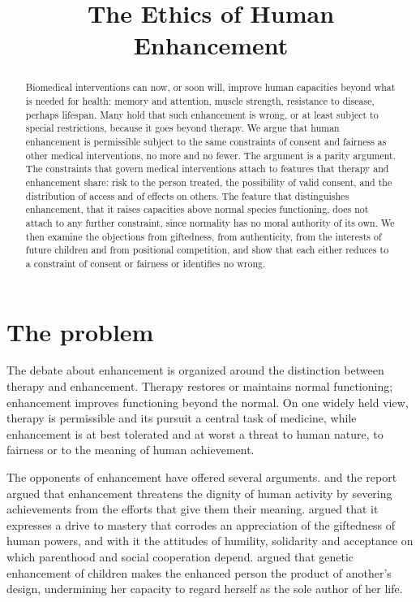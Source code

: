 \documentclass{situationist-preprint}
\title{The Ethics of Human Enhancement}
\begin{document}
\maketitle

\begin{abstract}
Biomedical interventions can now, or soon will, improve human capacities beyond what is needed for health: memory and attention, muscle strength, resistance to disease, perhaps lifespan. Many hold that such enhancement is wrong, or at least subject to special restrictions, because it goes beyond therapy. We argue that human enhancement is permissible subject to the same constraints of consent and fairness as other medical interventions, no more and no fewer. The argument is a parity argument. The constraints that govern medical interventions attach to features that therapy and enhancement share: risk to the person treated, the possibility of valid consent, and the distribution of access and of effects on others. The feature that distinguishes enhancement, that it raises capacities above normal species functioning, does not attach to any further constraint, since normality has no moral authority of its own. We then examine the objections from giftedness, from authenticity, from the interests of future children and from positional competition, and show that each either reduces to a constraint of consent or fairness or identifies no wrong.
\end{abstract}

\section{The problem}

The debate about enhancement is organized around the distinction between therapy and enhancement. Therapy restores or maintains normal functioning; enhancement improves functioning beyond the normal. On one widely held view, therapy is permissible and its pursuit a central task of medicine, while enhancement is at best tolerated and at worst a threat to human nature, to fairness or to the meaning of human achievement.

The opponents of enhancement have offered several arguments. \citet{Kass2003} and the \citet{PCB2003} report argued that enhancement threatens the dignity of human activity by severing achievements from the efforts that give them their meaning. \citet{Sandel2007} argued that it expresses a drive to mastery that corrodes an appreciation of the giftedness of human powers, and with it the attitudes of humility, solidarity and acceptance on which parenthood and social cooperation depend. \citet{Habermas2003} argued that genetic enhancement of children makes the enhanced person the product of another's design, undermining her capacity to regard herself as the sole author of her life.
\end{document}
